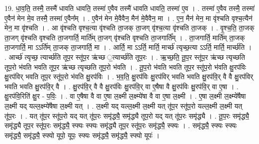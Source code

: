 \documentclass[17pt]{extarticle}
\begin{document}
19. धा॒व॒ति॒ तस्मै॒ तस्मै॑ धावति धावति॒ तस्मा॑ ए॒वैव तस्मै॑ धावति धावति॒ तस्मा॑ ए॒व । . तस्मा॑ ए॒वैव तस्मै॒ तस्मा॑ ए॒वैन॑ मेन मे॒व तस्मै॒ तस्मा॑ ए॒वैन᳚म् । . ए॒वैन॑ मेन मे॒वैवैन॒ मैन॑ मे॒वैवैन॒ मा । . ए॒न॒ मैन॑ मेन॒ मा वृ॑श्चति वृश्च॒त्यैन॑ मेन॒ मा वृ॑श्चति । . आ वृ॑श्चति वृश्च॒त्या वृ॑श्चति ता॒जक् ता॒जग् वृ॑श्च॒त्या वृ॑श्चति ता॒जक् । . वृ॒श्च॒ति॒ ता॒जक् ता॒जग् वृ॑श्चति वृश्चति ता॒जगार्ति॒ मार्ति॑म् ता॒जग् वृ॑श्चति वृश्चति ता॒जगार्ति᳚म् । . ता॒जगार्ति॒ मार्ति॑म् ता॒जक् ता॒जगार्ति॒ मा ऽऽर्ति॑म् ता॒जक् ता॒जगार्ति॒ मा । . आर्ति॒ मा ऽऽर्ति॒ मार्ति॒ मार्च्छ॑ त्यृच्छ॒त्या ऽऽर्ति॒ मार्ति॒ मार्च्छ॑ति । . आर्च्छ॑ त्यृच्छ॒ त्यार्च्छ॑ति तूप॒र स्तू॑प॒र ऋ॑च्छ ॒त्यार्च्छ॑ति तूप॒रः । . ऋ॒च्छ॒ति॒ तू॒प॒र स्तू॑प॒र ऋ॑च्छ त्यृच्छति तूप॒रो भ॑वति भवति तूप॒र ऋ॑च्छ त्यृच्छति तूप॒रो भ॑वति । . तू॒प॒रो भ॑वति भवति तूप॒र स्तू॑प॒रो भ॑वति क्षु॒रप॑विः क्षु॒रप॑विर् भवति तूप॒र स्तू॑प॒रो भ॑वति क्षु॒रप॑विः । . भ॒व॒ति॒ क्षु॒रप॑विः क्षु॒रप॑विर् भवति भवति क्षु॒रप॑वि॒र् वै वै क्षु॒रप॑विर् भवति भवति क्षु॒रप॑वि॒र् वै । . क्षु॒रप॑वि॒र् वै वै क्षु॒रप॑विः क्षु॒रप॑वि॒र् वा ए॒षैषा वै क्षु॒रप॑विः क्षु॒रप॑वि॒र् वा ए॒षा । . क्षु॒रप॑वि॒रिति॑ क्षु॒र - प॒विः॒ । . वा ए॒षैषा वै वा ए॒षा ल॒क्ष्मी ल॒क्ष्म्ये॑षा वै वा ए॒षा ल॒क्ष्मी । . ए॒षा ल॒क्ष्मी ल॒क्ष्म्ये॑षैषा ल॒क्ष्मी यद् यल्ल॒क्ष्म्ये॑षैषा ल॒क्ष्मी यत् । . ल॒क्ष्मी यद् यल्ल॒क्ष्मी ल॒क्ष्मी यत् तू॑प॒र स्तू॑प॒रो यल्ल॒क्ष्मी ल॒क्ष्मी यत् तू॑प॒रः । . यत् तू॑प॒र स्तू॑प॒रो यद् यत् तू॑प॒रः समृ॑द्ध्यै॒ समृ॑द्ध्यै तूप॒रो यद् यत् तू॑प॒रः समृ॑द्ध्यै । . तू॒प॒रः समृ॑द्ध्यै॒ समृ॑द्ध्यै तूप॒र स्तू॑प॒रः समृ॑द्ध्यै॒ स्फ्यः स्फ्यः समृ॑द्ध्यै तूप॒र स्तू॑प॒रः समृ॑द्ध्यै॒ स्फ्यः । . समृ॑द्ध्यै॒ स्फ्यः स्फ्यः समृ॑द्ध्यै॒ समृ॑द्ध्यै॒ स्फ्यो यूपो॒ यूपः॒ स्फ्यः समृ॑द्ध्यै॒ समृ॑द्ध्यै॒ स्फ्यो यूपः॑ । \newline
\end{document}
